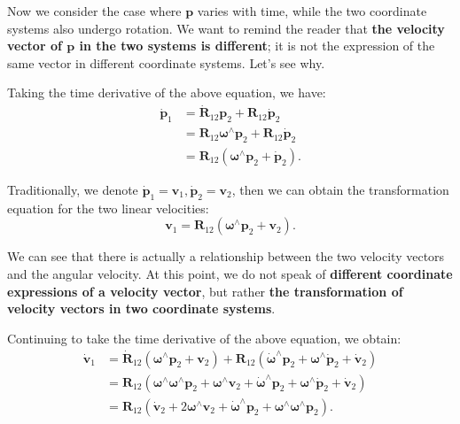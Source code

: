 Now we consider the case where $\mathbf{p}$ varies with time, while the two coordinate systems also undergo rotation. We want to remind the reader that \textbf{the velocity vector of $\mathbf{p}$ in the two systems is different}; it is not the expression of the same vector in different coordinate systems. Let's see why.

Taking the time derivative of the above equation, we have:
\begin{equation}\label{key}
	\begin{array}{ll}
		\dot{\mathbf{p}}_1 &= \dot{\mathbf{R}}_{12} \mathbf{p}_2 + \mathbf{R}_{12} \dot{\mathbf{p}}_2 \\
		&= \mathbf{R}_{12} \boldsymbol{\omega}^\wedge \mathbf{p}_2 + \mathbf{R}_{12}  \dot{\mathbf{p}}_2 \\
		&= \mathbf{R}_{12} (\boldsymbol{\omega}^\wedge \mathbf{p}_2 + \dot{\mathbf{p}}_2 ).
	\end{array}
\end{equation}

Traditionally, we denote $\dot{\mathbf{p}}_1 = \mathbf{v}_1, \dot{\mathbf{p}}_2 = \mathbf{v}_2$, then we can obtain the transformation equation for the two linear velocities:
\begin{equation}\label{eq:2.91}
	\mathbf{v}_1 = \mathbf{R}_{12}(\boldsymbol{\omega}^\wedge \mathbf{p}_2 + \mathbf{v}_2).
\end{equation}

We can see that there is actually a relationship between the two velocity vectors and the angular velocity. At this point, we do not speak of \textbf{different coordinate expressions of a velocity vector}, but rather \textbf{the transformation of velocity vectors in two coordinate systems}.

Continuing to take the time derivative of the above equation, we obtain:
\begin{equation}\label{key}
	\begin{array}{ll}
		\dot{\mathbf{v}}_1 &= {\dot{\mathbf{R}}_{12}}\left( {{\boldsymbol{\omega}^\wedge}{\mathbf{p}_2} + 
			{\mathbf{v}_2}} \right) + {\mathbf{R}_{12}}\left( {{{\dot{\boldsymbol{\omega}} }^\wedge}{\mathbf{p}_2} + 
			{\boldsymbol{\omega}^\wedge}{{\dot{\mathbf{p}}}_2} + {{\dot{\mathbf{v}}}_2}} \right)\\
		&= {\mathbf{R}_{12}}\left( 
		{{\boldsymbol{\omega}^\wedge}{\boldsymbol{\omega}^\wedge}{\mathbf{p}_2} + 
			{\boldsymbol{\omega}^\wedge}{\mathbf{v}_2} + {{\dot{\boldsymbol{\omega}} }^\wedge}{\mathbf{p}_2} 
			+ {\boldsymbol{\omega}^\wedge}{{\dot{\mathbf{p}}}_2} + {{\dot{\mathbf{v}}}_2}} \right)\\
		&= {\mathbf{R}_{12}}\left( {{{\dot{\mathbf{v}}}_2} + 2{\boldsymbol{\omega}^\wedge}{\mathbf{v}_2} + 
			{{\dot{\boldsymbol{\omega}} }^\wedge}{\mathbf{p}_2} + 
			{\boldsymbol{\omega}^\wedge}{\boldsymbol{\omega}^\wedge}{\mathbf{p}_2}} \right).
	\end{array}
\end{equation}

